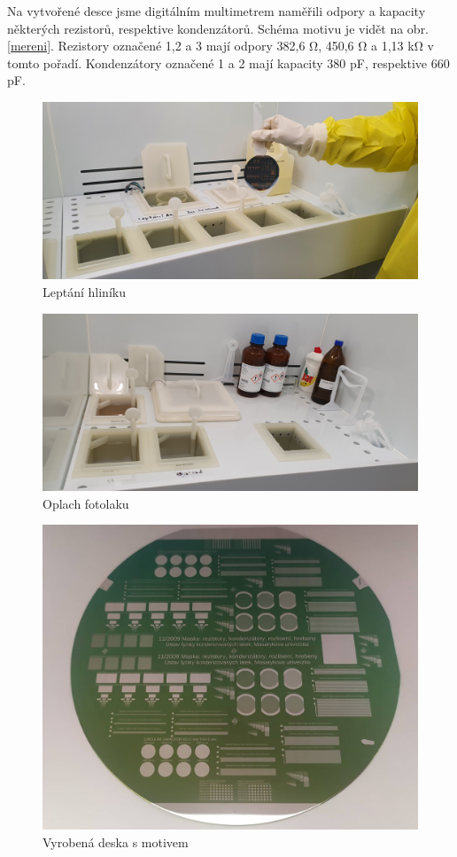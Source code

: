 \documentclass[a4paper,12pt]{article}
\begin{document}
Na vytvořené desce jsme digitálním multimetrem naměřili odpory a kapacity některých rezistorů, respektive kondenzátorů. Schéma motivu je vidět na obr. \ref{mereni}. Rezistory označené 1,2 a 3 mají odpory 382,6 \si{\ohm}, 450,6 \si{\ohm} a 1,13 \si{\kilo\ohm} v tomto pořadí. Kondenzátory označené 1 a 2 mají kapacity 380 \si{\pico\farad}, respektive 660 \si{\pico\farad}.


\begin{figure}[h!]
	\centering
	\includegraphics[width=130mm]{8Aletch.jpg}
	\caption{Leptání hliníku}
	\label{8Aletch}
\end{figure}

\begin{figure}[h!]
	\centering
	\includegraphics[width=130mm]{11oplach.jpg}
	\caption{Oplach fotolaku}
	\label{11oplach}
\end{figure}

\newpage
\begin{figure}[h!]
	\centering
	\includegraphics[width=130mm]{deska.jpg}
	\caption{Vyrobená deska s motivem}
	\label{deska}
\end{figure}
\end{document}
